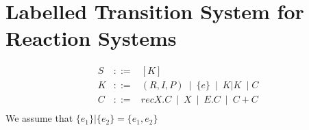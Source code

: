 \section{Labelled Transition System for Reaction Systems}
\label{sec:LTSforRS}

\begin{definition}\label{def:LTSforRS}
\[
\begin{array}{lcl}
S&::=&[K]\\
K&::=&(R,I,P)~\mid~\{e\}~\mid~K|K~\mid C\\
C&::=&recX.C~\mid~X~\mid~E.C~\mid~C+C\\
\end{array}
\]
We assume that $\{e_1\}|\{e_2\}= \{e_1,e_2\}$
\end{definition}


